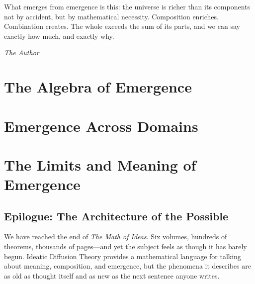 \documentclass[11pt,oneside]{book}
\theoremstyle{definition}
\theoremstyle{plain}
\theoremstyle{remark}
\begin{document}
What emerges from emergence is this: the universe is richer than its components
not by accident, but by mathematical necessity. Composition enriches.
Combination creates. The whole exceeds the sum of its parts, and we can say
exactly how much, and exactly why.

\vspace{1em}
\hfill\textit{The Author}

\tableofcontents

\mainmatter

\part{The Algebra of Emergence}



\part{Emergence Across Domains}



\part{The Limits and Meaning of Emergence}



\backmatter

\chapter*{Epilogue: The Architecture of the Possible}

We have reached the end of \emph{The Math of Ideas}. Six volumes, hundreds of
theorems, thousands of pages---and yet the subject feels as though it has barely
begun. Ideatic Diffusion Theory provides a mathematical language for talking about
meaning, composition, and emergence, but the phenomena it describes are as old as
thought itself and as new as the next sentence anyone writes.
\end{document}
